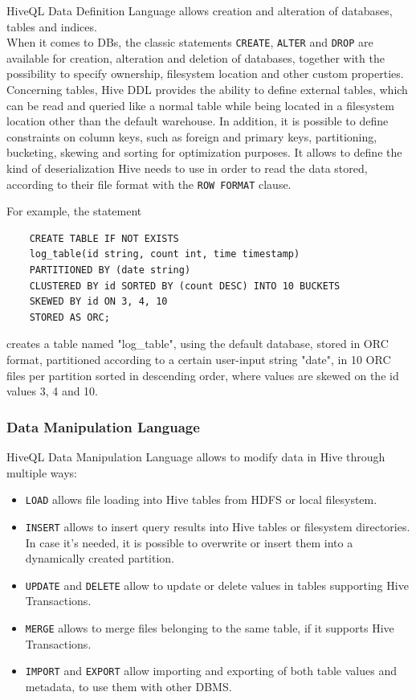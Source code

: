 HiveQL Data Definition Language allows creation and alteration of databases, tables and indices.\\When it comes to DBs, the classic statements \texttt{CREATE}, \texttt{ALTER} and \texttt{DROP} are available for creation, alteration and deletion of databases, together with the possibility to specify ownership, filesystem location and other custom properties.\\
Concerning tables, Hive DDL provides the ability to define external tables, which can be read and queried like a normal table while being located in a filesystem location other than the default warehouse. In addition, it is possible to define constraints on column keys, such as foreign and primary keys, partitioning, bucketing, skewing and sorting for optimization purposes. It allows to define the kind of deserialization Hive needs to use in order to read the data stored, according to their file format with the \texttt{ROW FORMAT} clause.

For example, the statement

\begin{verbatim}
    CREATE TABLE IF NOT EXISTS 
    log_table(id string, count int, time timestamp)
    PARTITIONED BY (date string)
    CLUSTERED BY id SORTED BY (count DESC) INTO 10 BUCKETS
    SKEWED BY id ON 3, 4, 10
    STORED AS ORC;
\end{verbatim}

creates a table named "log\_table", using the default database, stored in ORC format, partitioned according to a certain user-input string "date", in 10 ORC files per partition sorted in descending order, where values are skewed on the id values 3, 4 and 10.

\subsubsection{Data Manipulation Language}

HiveQL Data Manipulation Language allows to modify data in Hive through multiple ways:

\begin{itemize}
    \item \texttt{LOAD} allows file loading into Hive tables from HDFS or local filesystem.  
    \item \texttt{INSERT} allows to insert query results into Hive tables or filesystem directories. In case it's needed, it is possible to overwrite or insert them into a dynamically created partition. 
    \item \texttt{UPDATE} and \texttt{DELETE} allow to update or delete values in tables supporting Hive Transactions.
    \item \texttt{MERGE} allows to merge files belonging to the same table, if it supports Hive Transactions.
    \item \texttt{IMPORT} and \texttt{EXPORT} allow importing and exporting of both table values and metadata, to use them with other DBMS.
\end{itemize}

